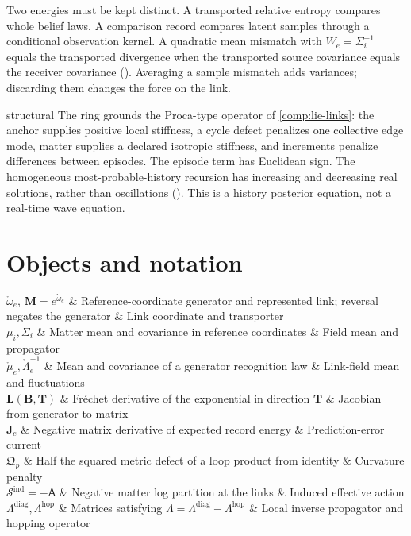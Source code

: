 Two energies must be kept distinct. A transported relative entropy compares whole belief laws.
A comparison record compares latent samples through a conditional observation kernel. A
quadratic mean mismatch with $W_e=\Sigma_i^{-1}$ equals the transported divergence when the
transported source covariance equals the receiver covariance
(). Averaging a sample mismatch adds variances;
discarding them changes the force on the link.

\begin{analogy}{structural}
The ring grounds the Proca-type operator of \cref{comp:lie-links}: the anchor supplies positive
local stiffness, a cycle defect penalizes one collective edge mode, matter supplies a declared
isotropic stiffness, and increments penalize differences between episodes. The episode term has
Euclidean sign. The homogeneous most-probable-history recursion has increasing and decreasing
real solutions, rather than oscillations (). This is a history
posterior equation, not a real-time wave equation.
\end{analogy}

\section{Objects and notation}

\begin{decoder}
\(\mathring\omega_e\), \(\mathbf M=e^{\mathring\omega_e}\) & Reference-coordinate generator and represented link; reversal negates the generator & Link coordinate and transporter\\
\(\mu_i,\Sigma_i\) & Matter mean and covariance in reference coordinates & Field mean and propagator\\
\(\mathring\mu_e,\mathring\Lambda_e^{-1}\) & Mean and covariance of a generator recognition law & Link-field mean and fluctuations\\
\(\mathbf L(\mathbf B,\mathbf T)\) & Fr\'echet derivative of the exponential in direction \(\mathbf T\) & Jacobian from generator to matrix\\
\(\mathbf J_e\) & Negative matrix derivative of expected record energy & Prediction-error current\\
\(\mathfrak Q_p\) & Half the squared metric defect of a loop product from identity & Curvature penalty\\
\(\mathscr S^{\mathrm{ind}}=-\mathsf A\) & Negative matter log partition at the links & Induced effective action\\
\(\Lambda^{\mathrm{diag}},\Lambda^{\mathrm{hop}}\) & Matrices satisfying \(\Lambda=\Lambda^{\mathrm{diag}}-\Lambda^{\mathrm{hop}}\) & Local inverse propagator and hopping operator\\
\end{decoder}


